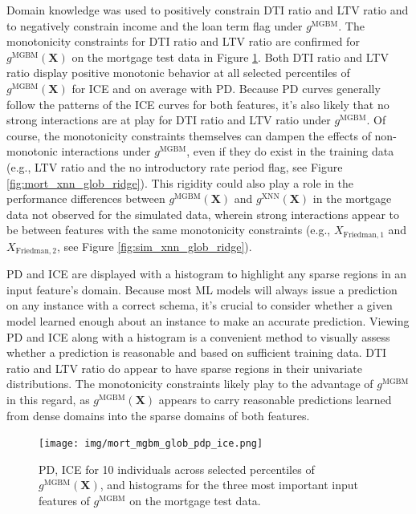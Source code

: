 \documentclass[information,article,submit,moreauthors,pdftex]{definitions/mdpi}
\begin{document}
Domain knowledge was used to positively constrain DTI ratio and LTV ratio and to negatively constrain income and the loan term flag under $g^\text{MGBM}$. The monotonicity constraints for DTI ratio and LTV ratio are confirmed for $g^\text{MGBM}(\mathbf{X})$ on the mortgage test data in Figure \ref{fig:mort_mgbm_glob_pdp_ice}. Both DTI ratio and LTV ratio display positive monotonic behavior at all selected percentiles of $g^\text{MGBM}(\mathbf{X})$ for ICE and on average with PD. Because PD curves generally follow the patterns of the ICE curves for both features, it's also likely that no strong interactions are at play for DTI ratio and LTV ratio under $g^\text{MGBM}$. Of course, the monotonicity constraints themselves can dampen the effects of non-monotonic interactions under $g^\text{MGBM}$, even if they do exist in the training data (e.g., LTV ratio and the no introductory rate period flag, see Figure \ref{fig:mort_xnn_glob_ridge}). This rigidity could also play a role in the performance differences between $g^\text{MGBM}(\mathbf{X})$ and $g^\text{XNN}(\mathbf{X})$ in the mortgage data not observed for the simulated data, wherein strong interactions appear to be between features with the same monotonicity constraints (e.g., $X_{\text{Friedman},1}$ and $X_{\text{Friedman},2}$, see Figure \ref{fig:sim_xnn_glob_ridge}).

PD and ICE are displayed with a histogram to highlight any sparse regions in an input feature's domain. Because most ML models will always issue a prediction on any instance with a correct schema, it's crucial to consider whether a given model learned enough about an instance to make an accurate prediction. Viewing PD and ICE along with a histogram is a convenient method to visually assess whether a prediction is reasonable and based on sufficient training data. DTI ratio and LTV ratio do appear to have sparse regions in their univariate distributions. The monotonicity constraints likely play to the advantage of $g^\text{MGBM}$ in this regard, as $g^\text{MGBM}(\mathbf{X})$ appears to carry reasonable predictions learned from dense domains into the sparse domains of both features. 

\begin{figure}[htb]
\hskip-10pt\texttt{[image: img/mort\_mgbm\_glob\_pdp\_ice.png]}
\caption{PD, ICE for 10 individuals across selected percentiles of $g^\text{MGBM}(\mathbf{X})$, and histograms for the three most important input features of $g^\text{MGBM}$ on the mortgage test data.}
\label{fig:mort_mgbm_glob_pdp_ice}
\end{figure}   
\end{document}
